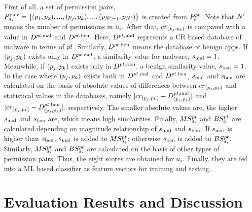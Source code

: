 \documentclass{ieeeaccess}
\begin{document}
First of all, a set of permission pairs, $P^{\mathrm{pair}}_{a_{i}} = \{(p_1, p_2), ..., (p_j, p_k), ..., (p_{N'-1}, p_{N'})\}$ is created from $P^{pt}_{a_{i}}$.
Note that $N'$ means the number of permissions in $a_{i}$.
After that, $cr_{(p_j, p_k)}$ is compared with a value in $D^{pt, \mathrm{mal}}$ and $D^{pt, \mathrm{ben}}$.
Here, $D^{pt, \mathrm{mal}}$ represents a CR based database of malware in terms of $pt$.
Similarly, $D^{pt, \mathrm{ben}}$ means the database of benign apps.
If $(p_j, p_k)$ exists only in $D^{pt, \mathrm{mal}}$, a similarity value for malware, $s_{\mathrm{mal}}=1$.
Meanwhile, if $(p_j, p_k)$ exists only in $D^{pt, \mathrm{ben}}$, a benign similarity value, $s_{\mathrm{ben}}=1$.
In the case where $(p_j, p_k)$ exists both in $D^{pt, \mathrm{mal}}$ and $D^{pt, \mathrm{ben}}$, $s_{\mathrm{mal}}$ and $s_{\mathrm{ben}}$ are calculated on the basis of absolute values of differences between $cr_{(p_j, p_k)}$ and statistical values in the databases, namely $|cr_{(p_j, p_k)} - D^{pt, \mathrm{mal}}_{(p_j, p_k)}|$ and $|cr_{(p_j, p_k)} - D^{pt, \mathrm{ben}}_{(p_j, p_k)}|$, respectively.
The smaller absolute values are, the higher $s_{\mathrm{mal}}$ and $s_{\mathrm{ben}}$ are, which means high similarities.
Finally, $MS^{pt}_{a_{i}}$ and $BS^{pt}_{a_{i}}$ are calculated depending on magnitude relationship of $s_{\mathrm{mal}}$ and $s_{\mathrm{ben}}$.
If $s_{\mathrm{mal}}$ is higher than $s_{\mathrm{ben}}$, $s_{\mathrm{mal}}$ is added to $MS^{pt}_{a_{i}}$; otherwise $s_{\mathrm{ben}}$ is added to $BS^{pt}_{a_{i}}$.  
Similarly, $MS^{pt}_{a_{i}}$ and $BS^{pt}_{a_{i}}$ are calculated on the basis of other types of permission pairs.
Thus, the eight scores are obtained for $a_{i}$.
Finally, they are fed into a ML based classifier as feature vectors for training and testing.  

\section{Evaluation Results and Discussion} \label{sec:simulation}
\end{document}
